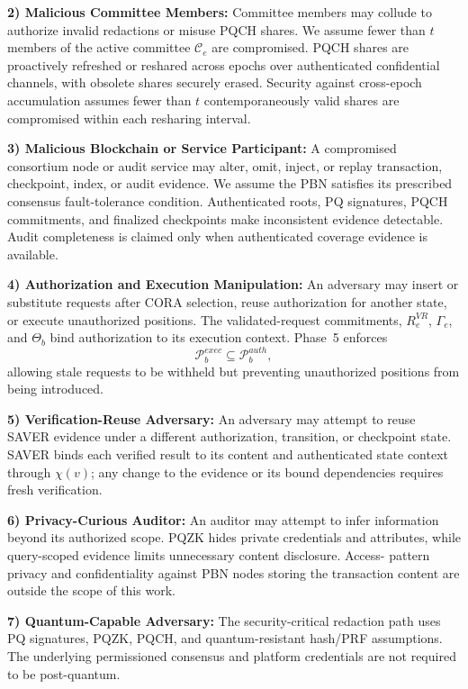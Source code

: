 \documentclass[lettersize,journal]{IEEEtran}
\begin{document}
\textbf{2) Malicious Committee Members:}
Committee members may collude to authorize invalid redactions or misuse
PQCH shares. We assume fewer than $t$ members of the active committee
$\mathcal{C}_e$ are compromised. PQCH shares are proactively refreshed
or reshared across epochs over authenticated confidential channels,
with obsolete shares securely erased. Security against cross-epoch
accumulation assumes fewer than $t$ contemporaneously valid shares are
compromised within each resharing interval.

\textbf{3) Malicious Blockchain or Service Participant:}
A compromised consortium node or audit service may alter, omit, inject,
or replay transaction, checkpoint, index, or audit evidence. We assume
the PBN satisfies its prescribed consensus fault-tolerance condition.
Authenticated roots, PQ signatures, PQCH commitments, and finalized
checkpoints make inconsistent evidence detectable. Audit completeness
is claimed only when authenticated coverage evidence is available.

\textbf{4) Authorization and Execution Manipulation:}
An adversary may insert or substitute requests after CORA selection,
reuse authorization for another state, or execute unauthorized
positions. The validated-request commitments, $R_e^{VR}$, $\Gamma_e$,
and $\Theta_b$ bind authorization to its execution context. Phase~5
enforces
\begin{equation}
\mathcal{P}_b^{exec}\subseteq\mathcal{P}_b^{auth},
\end{equation}
allowing stale requests to be withheld but preventing unauthorized
positions from being introduced.

\textbf{5) Verification-Reuse Adversary:}
An adversary may attempt to reuse SAVER evidence under a different
authorization, transition, or checkpoint state. SAVER binds each
verified result to its content and authenticated state context through
$\chi(v)$; any change to the evidence or its bound dependencies
requires fresh verification.

\textbf{6) Privacy-Curious Auditor:}
An auditor may attempt to infer information beyond its authorized
scope. PQZK hides private credentials and attributes, while
query-scoped evidence limits unnecessary content disclosure. Access-
pattern privacy and confidentiality against PBN nodes storing the
transaction content are outside the scope of this work.

\textbf{7) Quantum-Capable Adversary:}
The security-critical redaction path uses PQ signatures, PQZK, PQCH,
and quantum-resistant hash/PRF assumptions. The underlying permissioned
consensus and platform credentials are not required to be
post-quantum.
\end{document}
